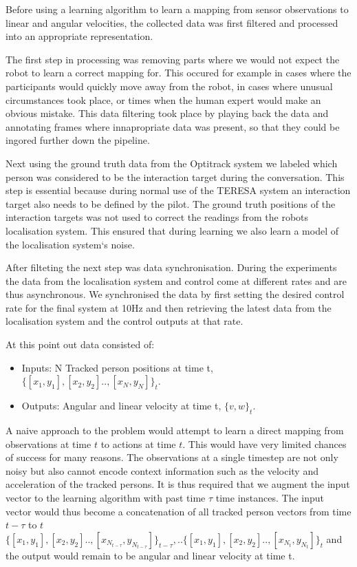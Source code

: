 \documentclass[a4paper,11pt]{report}
\begin{document}
Before using a learning algorithm to learn a mapping from sensor observations to linear and angular velocities, the collected data was first filtered and processed into an appropriate representation. 

The first step in processing was removing parts where we would not expect the robot to learn a correct mapping for. This occured for example in cases where the participants would quickly move away from the robot, in cases where unusual circumstances took place, or times when the human expert would make an obvious mistake. This data filtering took place by playing back the data and annotating frames where innapropriate data was present, so that they could be ingored further down the pipeline. 

Next using the ground truth data from the Optitrack system we labeled which person was considered to be the interaction target during the conversation. This step is essential because during normal use of the TERESA system an interaction target also needs to be defined by the pilot. The ground truth positions of the interaction targets was not used to correct the readings from the robots localisation system. This ensured that during learning we also learn a model of the localisation system`s noise. 

After filteting the next step was data synchronisation. During the experiments the data from the localisation system and control come at different rates and are thus asynchronous. We synchronised the data by first setting the desired control rate for the final system at 10Hz and then retrieving the latest data from the localisation system and the control outputs at that rate.   

At this point out data consisted of:
\begin{itemize}
	\item Inputs: N Tracked person positions at time t, $\{[x_1,y_1],[x_2,y_2] .., [x_N,y_N]\}_t$.
	\item Outputs: Angular and linear velocity at time t, $\{v,w\}_t$.
\end{itemize}

A naive approach to the problem would attempt to learn a direct mapping from observations at time $t$ to actions at time $t$. This would have very limited chances of success for many reasons. The observations at a single timestep are not only noisy but also cannot encode context information such as the velocity and acceleration of the tracked persons. It is thus required that we augment the input vector to the learning algorithm with past time $\tau$ time instances. The input vector would thus become a concatenation of all tracked person vectors from time $t- \tau$ to $t$ $\{[x_1,y_1],[x_2,y_2] .., [x_{N_{t-\tau}},y_{N_{t-\tau}}]\}_{t-\tau},.. \{[x_1,y_1],[x_2,y_2] .., [x_{N_t},y_{N_t}]\}_t$ and the output would remain to be angular and linear velocity at time t.
\end{document}
